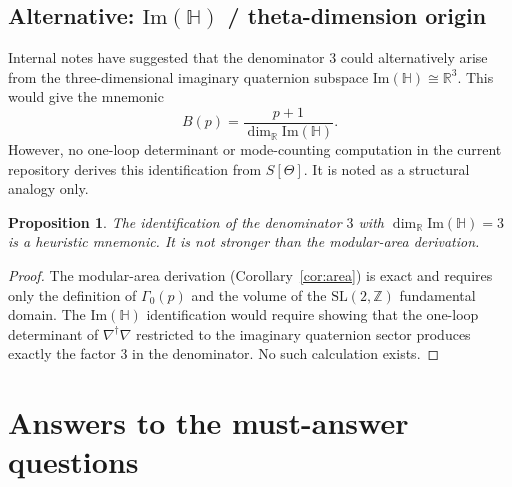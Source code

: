 \documentclass[12pt,a4paper]{article}
\newtheorem{proposition}[theorem]{Proposition}
\theoremstyle{definition}
\theoremstyle{remark}
\newcommand{\SL}{\mathrm{SL}}
\newcommand{\HH}{\mathbb{H}}       %
\newcommand{\RR}{\mathbb{R}}
\newcommand{\ZZ}{\mathbb{Z}}
\newcommand{\Gam}{\Gamma}
\begin{document}
\subsection{Alternative: $\mathrm{Im}(\HH)$ / theta-dimension origin}

Internal notes have suggested that the denominator $3$ could alternatively
arise from the three-dimensional imaginary quaternion subspace
$\mathrm{Im}(\HH)\cong\RR^3$.  This would give the mnemonic
\[
  B(p) = \frac{p+1}{\dim_\RR\mathrm{Im}(\HH)}.
\]
However, no one-loop determinant or mode-counting computation in the
current repository derives this identification from $S[\Theta]$.  It is
noted as a structural analogy only.

\begin{proposition}
\label{prop:im3}
The identification of the denominator $3$ with
$\dim_\RR\mathrm{Im}(\HH)=3$ is a heuristic mnemonic.  It is not
stronger than the modular-area derivation.
\end{proposition}

\begin{proof}
The modular-area derivation (Corollary~\ref{cor:area}) is exact and
requires only the definition of $\Gam_0(p)$ and the volume of the
$\SL(2,\ZZ)$ fundamental domain.  The $\mathrm{Im}(\HH)$ identification
would require showing that the one-loop determinant of
$\nabla^\dagger\nabla$ restricted to the imaginary quaternion sector
produces exactly the factor $3$ in the denominator.  No such calculation
exists.
\end{proof}

\section{Answers to the must-answer questions}
\label{sec:answers}
\end{document}
